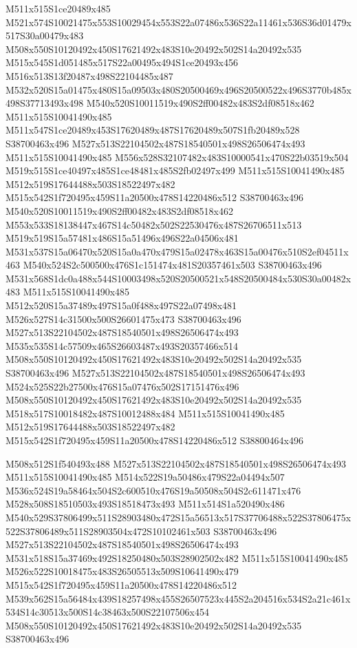 \documentclass{article}
\begin{document}
\begin{multicols}{2}
M511x515S1ce20489x485 M521x574S10021475x553S10029454x553S22a07486x536S22a11461x536S36d01479x517S30a00479x483 M508x550S10120492x450S17621492x483S10e20492x502S14a20492x535 M515x545S1d051485x517S22a00495x494S1ce20493x456 M516x513S13f20487x498S22104485x487 M532x520S15a01475x480S15a09503x480S20500469x496S20500522x496S3770b485x498S37713493x498 M540x520S10011519x490S2ff00482x483S2df08518x462 M511x515S10041490x485 M511x547S1ce20489x453S17620489x487S17620489x507S1fb20489x528 S38700463x496 M527x513S22104502x487S18540501x498S26506474x493 M511x515S10041490x485 M556x528S32107482x483S10000541x470S22b03519x504 M519x515S1ce40497x485S1ce48481x485S2fb02497x499 M511x515S10041490x485 M512x519S17644488x503S18522497x482 M515x542S1f720495x459S11a20500x478S14220486x512 S38700463x496 M540x520S10011519x490S2ff00482x483S2df08518x462 M553x533S18138447x467S14c50482x502S22530476x487S26706511x513 M519x519S15a57481x486S15a51496x496S22a04506x481 M531x537S15a06470x520S15a0a470x479S15a02478x463S15a00476x510S2ef04511x463 M540x524S2c500500x476S1c151474x481S20357461x503 S38700463x496 M531x568S1dc0a488x544S10003498x520S20500521x548S20500484x530S30a00482x483 M511x515S10041490x485 M512x520S15a37489x497S15a0f488x497S22a07498x481 M526x527S14c31500x500S26601475x473 S38700463x496 M527x513S22104502x487S18540501x498S26506474x493 M535x535S14c57509x465S26603487x493S20357466x514 M508x550S10120492x450S17621492x483S10e20492x502S14a20492x535 S38700463x496 M527x513S22104502x487S18540501x498S26506474x493 M524x525S22b27500x476S15a07476x502S17151476x496 M508x550S10120492x450S17621492x483S10e20492x502S14a20492x535 M518x517S10018482x487S10012488x484 M511x515S10041490x485 M512x519S17644488x503S18522497x482 M515x542S1f720495x459S11a20500x478S14220486x512 S38800464x496

M508x512S1f540493x488 M527x513S22104502x487S18540501x498S26506474x493 M511x515S10041490x485 M514x522S19a50486x479S22a04494x507 M536x524S19a58464x504S2c600510x476S19a50508x504S2c611471x476 M528x508S18510503x493S18518473x493 M511x514S1a520490x486 M540x529S37806499x511S28903480x472S15a56513x517S37706488x522S37806475x522S37806489x511S28903504x472S10102461x503 S38700463x496 M527x513S22104502x487S18540501x498S26506474x493 M531x518S15a37469x492S18250480x503S28902502x482 M511x515S10041490x485 M526x522S10018475x483S26505513x509S10641490x479 M515x542S1f720495x459S11a20500x478S14220486x512 M539x562S15a56484x439S18257498x455S26507523x445S2a204516x534S2a21c461x534S14c30513x500S14c38463x500S22107506x454 M508x550S10120492x450S17621492x483S10e20492x502S14a20492x535 S38700463x496


\end{multicols}
\end{document}

